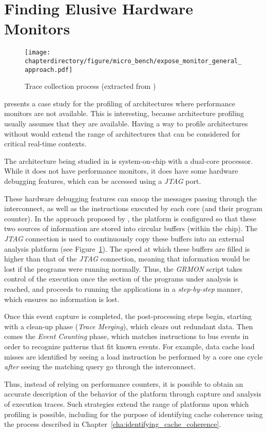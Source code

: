 \section{Finding Elusive Hardware Monitors}
\label{sec:elusive_hardware_monitors}
\begin{figure}[hbt!]
\centering
\texttt{[image: \\chapterdirectory/figure/micro\_bench/expose\_monitor\_general\_approach.pdf]}
\caption{%
Trace collection process (extracted from \cite{palomo_et_al:LIPIcs:2020:12378})
}
\label{fig:micro_bench:expose_monitors}
\end{figure}

\cite{palomo_et_al:LIPIcs:2020:12378} presents a case study for the profiling of
architectures where performance monitors are not available. This is interesting,
because architecture profiling usually assumes that they are available. Having
a way to profile architectures without would extend the range of architectures
that can be considered for critical real-time contexts.

The architecture being studied in \cite{palomo_et_al:LIPIcs:2020:12378} is
system-on-chip with a dual-core processor.  While it does not have performance
monitors, it does have some hardware debugging features, which can be accessed
using a \textit{JTAG} port.

These hardware debugging features can snoop the messages passing through the
interconnect, as well as the instructions executed by each core (and their
program counter). In the approach proposed by
\cite{palomo_et_al:LIPIcs:2020:12378}, the platform is configured so that these
two sources of information are stored into circular buffers (within the chip).
The \textit{JTAG} connection is used to continuously copy these buffers into an
external analysis platform (see Figure~\ref{fig:micro_bench:expose_monitors}).
The speed at which these buffers are filled is higher than that of the
\textit{JTAG} connection, meaning that information would be lost if the programs
were running normally. Thus, the \textit{GRMON} script takes control of the
execution once the section of the programs under analysis is reached, and
proceeds to running the applications in a \textit{step-by-step} manner, which
ensures no information is lost.

Once this event capture is completed, the post-processing steps begin, starting
with a clean-up phase (\textit{Trace Merging}), which clears out redundant data.
Then comes the \textit{Event Counting} phase, which matches instructions to bus
events in order to recognize patterns that fit known events. For example, data
cache load misses are identified by seeing a load instruction be performed by
a core one cycle \textit{after} seeing the matching query go through the
interconnect.

Thus, instead of relying on performance counters, it is possible to obtain an
accurate description of the behavior of the platform through capture and
analysis of execution traces. Such strategies extend the range of platforms upon
which profiling is possible, including for the purpose of identifying cache
coherence using the process described in
Chapter~\ref{cha:identifying_cache_coherence}.
